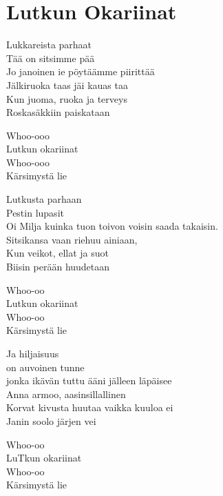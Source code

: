 \section{Lutkun Okariinat}
Lukkareista parhaat\\
Tää on sitsimme pää\\
Jo janoinen ie pöytäämme piirittää\\
Jälkiruoka taas jäi kauas taa\\
Kun juoma, ruoka ja terveys\\
Roskasäkkiin paiskataan

Whoo-ooo\\
Lutkun okariinat\\
Whoo-ooo\\
Kärsimystä lie

Lutkusta parhaan\\
Pestin lupasit\\
Oi Milja kuinka tuon toivon voisin saada takaisin.\\
Sitsikansa vaan riehuu ainiaan,\\
Kun veikot, ellat ja suot\\
Biisin perään huudetaan

Whoo-oo\\
Lutkun okariinat\\
Whoo-oo\\
Kärsimystä lie

Ja hiljaisuus\\
on auvoinen tunne\\
jonka ikävän tuttu ääni jälleen läpäisee\\
Anna armoo, aasinsillallinen\\
Korvat kivusta huutaa vaikka kuuloa ei\\
Janin soolo järjen vei

Whoo-oo\\
LuTkun okariinat\\
Whoo-oo\\
Kärsimystä lie

